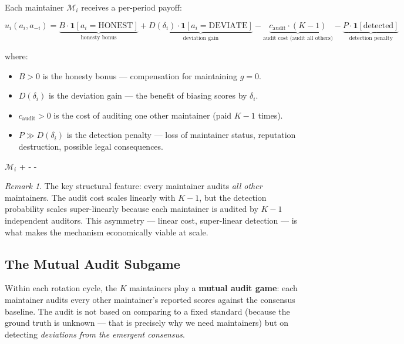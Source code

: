 \documentclass[12pt,a4paper]{article}
\theoremstyle{remark}
\newtheorem{remark}[theorem]{Remark}
\newcommand{\indicator}{\mathbf{1}}
\newcommand{\payoff}[1]{u_{#1}}
\newcommand{\auditCost}{c_{\text{audit}}}
\begin{document}
Each maintainer $\mathcal{M}_i$ receives a per-period payoff:

\begin{equation}\label{eq:payoff}
    \payoff{i}(a_i, a_{-i}) = 
    \underbrace{B \cdot \indicator[a_i = \text{HONEST}]}_{\text{honesty bonus}} + 
    \underbrace{D(\delta_i) \cdot \indicator[a_i = \text{DEVIATE}]}_{\text{deviation gain}} - 
    \underbrace{\auditCost \cdot (K-1)}_{\text{audit cost (audit all others)}} -
    \underbrace{P \cdot \indicator[\text{detected}]}_{\text{detection penalty}}
\end{equation}

where:
\begin{itemize}[leftmargin=*]
    \item $B > 0$ is the honesty bonus — compensation for maintaining $g = 0$.
    \item $D(\delta_i)$ is the deviation gain — the benefit of biasing scores by $\delta_i$.
    \item $\auditCost > 0$ is the cost of auditing one other maintainer (paid $K-1$ times).
    \item $P \gg D(\delta_i)$ is the detection penalty — loss of maintainer status, reputation destruction, possible legal consequences.
\end{itemize}

\noindent\textbf{}
$\mathcal{M}_i$ +  -  - 

\begin{remark}
The key structural feature: every maintainer audits \textit{all other} maintainers.
The audit cost scales linearly with $K-1$, but the detection probability scales
super-linearly because each maintainer is audited by $K-1$ independent auditors.
This asymmetry — linear cost, super-linear detection — is what makes the
mechanism economically viable at scale.
\end{remark}

\subsection{The Mutual Audit Subgame}

Within each rotation cycle, the $K$ maintainers play a \textbf{mutual audit game}:
each maintainer audits every other maintainer's reported scores against the
consensus baseline. The audit is not based on comparing to a fixed standard
(because the ground truth is unknown — that is precisely why we need
maintainers) but on detecting \textit{deviations from the emergent consensus}.
\end{document}
